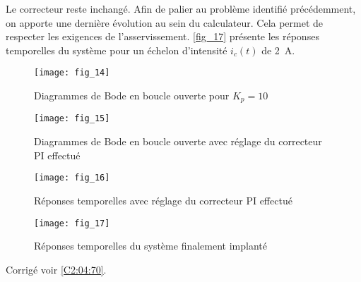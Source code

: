 \ifprof
\else

Le correcteur reste inchangé. Afin de palier au problème identifié précédemment, on apporte une dernière évolution au sein du calculateur. Cela permet de respecter les exigences de l’asservissement. \autoref{fig_17} présente les réponses temporelles du système pour un échelon d’intensité $i_c(t)$ de \SI{2}{A}.
\fi



\ifprof
\else
\begin{figure}[H]
\centering
\texttt{[image: fig\_14]}
\caption{Diagrammes de Bode en boucle ouverte pour $K_p = 10$\label{fig_14}}
\end{figure}


\begin{figure}[H]
\centering
\texttt{[image: fig\_15]}
\caption{Diagrammes de Bode en boucle ouverte avec réglage du correcteur PI effectué \label{fig_15}}
\end{figure}

\begin{figure}[H]
\centering
\texttt{[image: fig\_16]}
\caption{Réponses temporelles avec réglage du correcteur PI effectué \label{fig_16}}
\end{figure}


\begin{figure}[H]
\centering
\texttt{[image: fig\_17]}
\caption{Réponses temporelles du système finalement implanté\label{fig_17}}
\end{figure}
\fi


\ifprof
\else

\noindent\footnotesize
\normalsize

\begin{flushright}
\footnotesize{Corrigé  voir \ref{C2:04:70}.}
\end{flushright}%
\fi